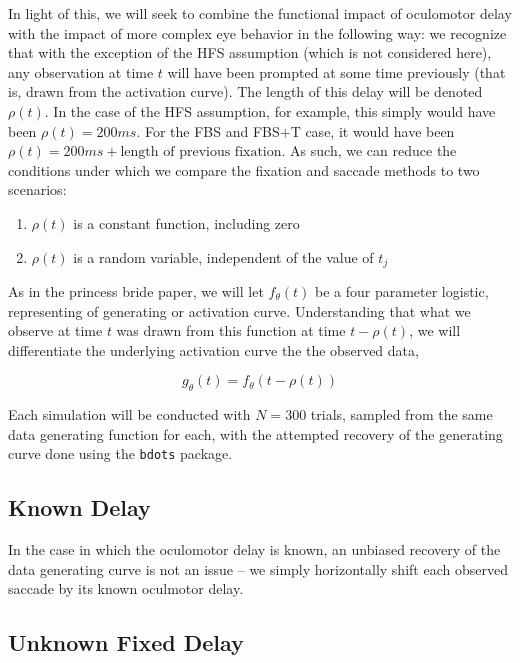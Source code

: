 \documentclass{article}
\newcommand{\xt}{\texttt}%
\begin{document}
In light of this, we will seek to combine the functional impact of oculomotor delay with the impact of more complex eye behavior in the following way: we recognize that with the exception of the HFS assumption (which is not considered here), any observation at time $t$ will have been prompted at some time previously (that is, drawn from the activation curve). The length of this delay will be denoted $\rho(t)$. In the case of the HFS assumption, for example, this simply would have been $\rho(t) = 200ms$. For the FBS and FBS+T case, it would have been $\rho(t) = 200ms + \text{length of previous fixation}$. As such, we can reduce the conditions under which we compare the fixation and saccade methods to two scenarios:

\begin{singlespace}
\begin{enumerate}
\item $\rho(t)$ is a constant function, including zero
\item $\rho(t)$ is a random variable, independent of the value of $t_j$
\end{enumerate}
\end{singlespace}

As in the princess bride paper, we will let $f_{\theta}(t)$ be a four parameter logistic, representing of generating or activation curve. Understanding that what we observe at time $t$ was drawn from this function at time $t - \rho(t)$, we will differentiate the underlying activation curve the the observed data, 

\begin{equation}
g_{\theta}(t) = f_{\theta}(t - \rho(t))
\end{equation}


Each simulation will be conducted with $N = 300$ trials, sampled from the same data generating function for each, with the attempted recovery of the generating curve done using the \xt{bdots} package. 


\subsection{Known Delay}


In the case in which the oculomotor delay is known, an unbiased recovery of the data generating curve is not an issue -- we simply horizontally shift each observed saccade by its known oculmotor delay.


\subsection{Unknown Fixed Delay}
\end{document}
